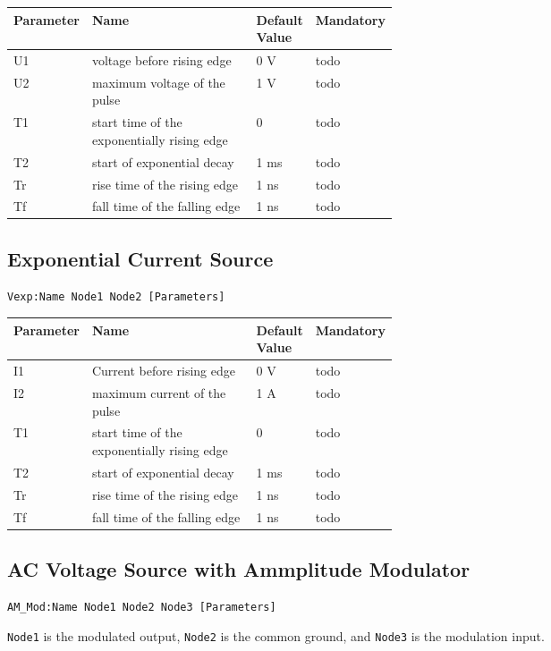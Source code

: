 \begin{tabular}{|l|p{0.5\linewidth}|l|l|}
\hline
Parameter & Name & Default Value & Mandatory \\
\hline
U1 & voltage before rising edge & 0 V & todo \\
U2 & maximum voltage of the pulse & 1 V & todo \\
T1 & start time of the exponentially rising edge & 0 & todo \\
T2 & start of exponential decay & 1 ms & todo \\
Tr & rise time of the rising edge & 1 ns & todo \\
Tf & fall time of the falling edge & 1 ns & todo \\
\hline
\end{tabular}


\subsection{Exponential Current Source}

\begin{verbatim}
Vexp:Name Node1 Node2 [Parameters]
\end{verbatim}


\begin{tabular}{|l|p{0.5\linewidth}|l|l|}
\hline
Parameter & Name & Default Value & Mandatory \\
\hline
I1 & Current before rising edge & 0 V & todo \\
I2 & maximum current of the pulse & 1 A & todo \\
T1 & start time of the exponentially rising edge & 0 & todo \\
T2 & start of exponential decay & 1 ms & todo \\
Tr & rise time of the rising edge & 1 ns & todo \\
Tf & fall time of the falling edge & 1 ns & todo \\
\hline
\end{tabular}


\subsection{AC Voltage Source with Ammplitude Modulator}

\begin{verbatim}
AM_Mod:Name Node1 Node2 Node3 [Parameters]
\end{verbatim}

\verb+Node1+ is the modulated output, \verb+Node2+ is the common ground, and \verb+Node3+ is the modulation input.

